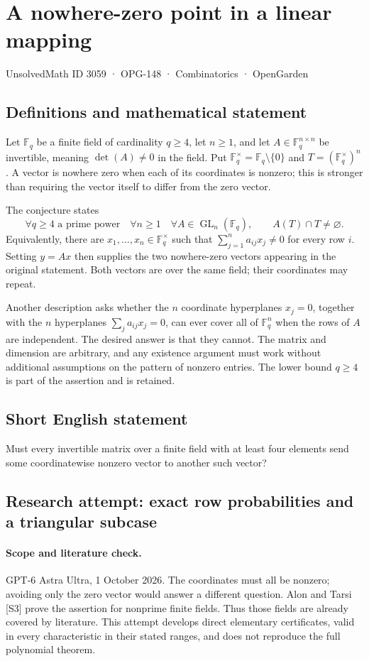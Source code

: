 \documentclass[11pt,a4paper]{article}
\begin{document}
\section*{A nowhere-zero point in a linear mapping}\label{3059}
{\small UnsolvedMath ID 3059 · OPG-148 · Combinatorics · OpenGarden}
\subsection{Definitions and mathematical statement}
Let $\mathbb F_q$ be a finite field of cardinality $q\ge4$, let $n\ge1$,
and let $A\in\mathbb F_q^{n\times n}$ be invertible, meaning
$\det(A)\ne0$ in the field. Put
$\mathbb F_q^\times=\mathbb F_q\setminus\{0\}$ and
$T=(\mathbb F_q^\times)^n$.
A vector is nowhere zero when each of its coordinates is nonzero; this
is stronger than requiring the vector itself to differ from the zero vector.

The conjecture states
\[
 \forall q\ge4\text{ a prime power}\quad\forall n\ge1\quad
 \forall A\in\operatorname{GL}_n(\mathbb F_q),\qquad
 A(T)\cap T\ne\varnothing.
\]
Equivalently, there are $x_1,\ldots,x_n\in\mathbb F_q^\times$ such that
$\sum_{j=1}^n a_{ij}x_j\ne0$ for every row $i$. Setting $y=Ax$ then
supplies the two nowhere-zero vectors appearing in the original statement.
Both vectors are over the same field; their coordinates may repeat.

Another description asks whether the $n$ coordinate hyperplanes
$x_j=0$, together with the $n$ hyperplanes
$\sum_j a_{ij}x_j=0$, can ever cover all of $\mathbb F_q^n$ when the rows
of $A$ are independent. The desired answer is that they cannot.
The matrix and dimension are arbitrary, and any existence argument must
work without additional assumptions on the pattern of nonzero entries.
The lower bound $q\ge4$ is part of the assertion and is retained.
\subsection{Short English statement}
Must every invertible matrix over a finite field with at least four elements send some coordinatewise nonzero vector to another such vector?
\subsection{Research attempt: exact row probabilities and a triangular subcase}
\paragraph{Scope and literature check.}
GPT-6 Astra Ultra, 1 October 2026. The coordinates must all be nonzero;
avoiding only the zero vector would answer a different question. Alon
and Tarsi [S3] prove the assertion for nonprime finite fields. Thus those
fields are already covered by literature. This attempt develops direct
elementary certificates, valid in every characteristic in their stated
ranges, and does not reproduce the full polynomial theorem.
\end{document}
